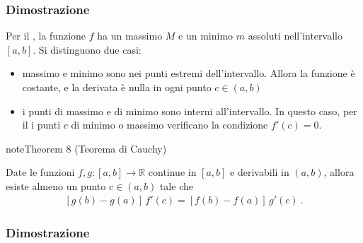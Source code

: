 \documentclass[letterpaper,10pt,italian]{jupyterBook}
\begin{document}
\subsubsection*{Dimostrazione}

\sphinxAtStartPar
Per il {\hyperref[\detokenize{ch/infinitesimal_calculus/analysis:infinitesimal-calculus-continuous-fun-thms-weierstrass}]{}}, la funzione \(f\) ha un massimo \(M\) e un minimo \(m\) assoluti nell’intervallo \([a,b]\). Si distinguono due casi:
\begin{itemize}
\item {} 
\sphinxAtStartPar
massimo e minimo sono nei punti estremi dell’intervallo. Allora la funzione è costante, e la derivata è nulla in ogni punto \(c \in (a,b)\)

\item {} 
\sphinxAtStartPar
i punti di massimo e di minimo sono interni all’intervallo. In questo caso, per il {\hyperref[\detokenize{ch/infinitesimal_calculus/derivatives:infinitesimal-calculus-derivatives-thm-rolle}]{}} i punti \(c\) di minimo o massimo verificano la condizione \(f'(c) = 0\).

\end{itemize}
\label{ch/infinitesimal_calculus/derivatives:thm:infinitesimal-calculus:derivatives:thm:cauchy}
\begin{sphinxadmonition}{note}{Theorem 8 (Teorema di Cauchy)}



\sphinxAtStartPar
Date le funzioni \(f, g: [a,b] \rightarrow \mathbb{R}\) continue in \([a,b]\) e derivabili in \((a,b)\), allora esiste almeno un punto \(c \in (a,b)\) tale che
\begin{equation*}
\begin{split}\left[ g(b) - g(a) \right] \, f'(c) = \left[ f(b) - f(a) \right] \, g'(c) \ .\end{split}
\end{equation*}\end{sphinxadmonition}
\subsubsection*{Dimostrazione}
\end{document}
